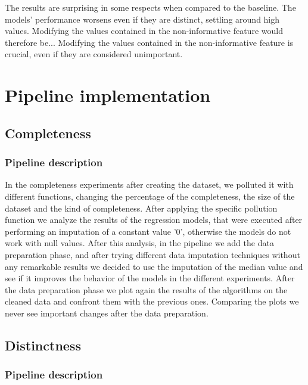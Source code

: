 \documentclass{Configuration_Files/PoliMi3i_thesis}
\begin{document}
\begin{enumerate}
The results are surprising in some respects when compared to the baseline. The models' performance worsens even if they are distinct, settling around high values. Modifying the values contained in the non-informative feature would therefore be... Modifying the values contained in the non-informative feature is crucial, even if they are considered unimportant.
\end{enumerate}


\chapter{Pipeline implementation}
\label{ch:chapter_3}%

\section{Completeness}
\label{sec:section_3_1}%

\subsection{Pipeline description}
\label{subsec:section_3_1_1}%

In the completeness experiments after creating the dataset, we polluted it with different functions, changing the percentage of the completeness, the size of the dataset and the kind of completeness. After applying the specific pollution function we analyze the results of the regression models, that were executed after performing an imputation of a constant value '0', otherwise the models do not work with null values. 
After this analysis, in the pipeline we add the data preparation phase, and after trying different data imputation techniques without any remarkable results we decided to use the imputation of the median value and see if it improves the behavior of the models in the different experiments. After the data preparation phase we plot again the results of the algorithms on the cleaned data and confront them with the previous ones. Comparing the plots we never see important changes after the data preparation.


\section{Distinctness}
\label{sec:section_3_2}%

\subsection{Pipeline description}
\label{subsec:section_3_2_1}%
\end{document}
